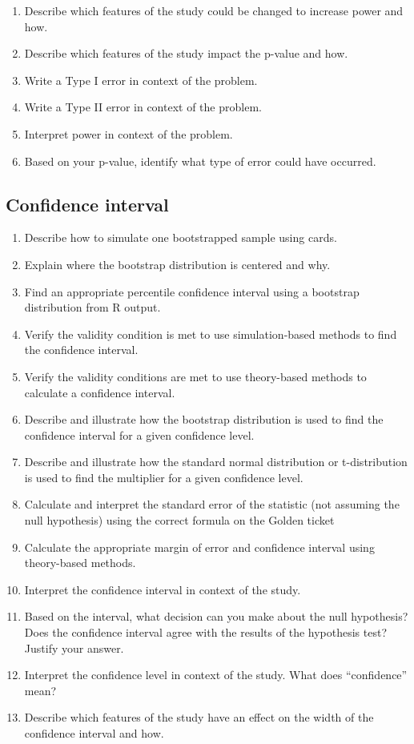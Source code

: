 \documentclass[
]{report}
\begin{document}
\begin{enumerate}
\item
  Describe which features of the study could be changed to increase power and how.
\item
  Describe which features of the study impact the p-value and how.
\item
  Write a Type I error in context of the problem.
\item
  Write a Type II error in context of the problem.
\item
  Interpret power in context of the problem.
\item
  Based on your p-value, identify what type of error could have occurred.
\end{enumerate}

\subsection*{Confidence interval}\label{confidence-interval-2}

\begin{enumerate}
\def\labelenumi{\arabic{enumi}.}
\setcounter{enumi}{30}
\item
  Describe how to simulate one bootstrapped sample using cards.
\item
  Explain where the bootstrap distribution is centered and why.
\item
  Find an appropriate percentile confidence interval using a bootstrap distribution from R output.
\item
  Verify the validity condition is met to use simulation-based methods to find the confidence interval.
\item
  Verify the validity conditions are met to use theory-based methods to calculate a confidence interval.
\item
  Describe and illustrate how the bootstrap distribution is used to find the confidence interval for a given confidence level.
\item
  Describe and illustrate how the standard normal distribution or t-distribution is used to find the multiplier for a given confidence level.
\item
  Calculate and interpret the standard error of the statistic (not assuming the null hypothesis) using the correct formula on the Golden ticket
\item
  Calculate the appropriate margin of error and confidence interval using theory-based methods.
\item
  Interpret the confidence interval in context of the study.
\item
  Based on the interval, what decision can you make about the null hypothesis? Does the confidence interval agree with the results of the hypothesis test? Justify your answer.
\item
  Interpret the confidence level in context of the study. What does ``confidence'' mean?
\item
  Describe which features of the study have an effect on the width of the confidence interval and how.
\end{enumerate}
\end{document}
